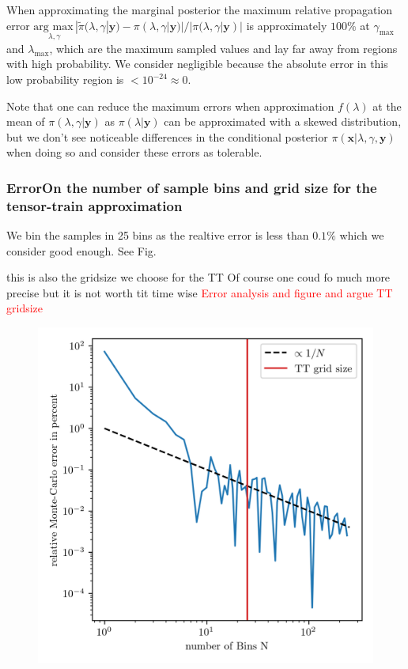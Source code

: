 When approximating the marginal posterior the maximum relative propagation error $\underset{\lambda , \gamma}{\text{arg max}\,}|\tilde{\pi}(\lambda,\gamma|\bm{y}) - \pi(\lambda,\gamma|\bm{y}) |/ |\pi(\lambda,\gamma|\bm{y})|$ is approximately $100\%$ at $\gamma_{\text{max}}$ and $\lambda_{\text{max}}$, which are the maximum sampled values and lay far away from regions with high probability.
We consider negligible because the absolute error in this low probability region is $< 10^{-24} \approx 0$.


Note that one can reduce the maximum errors when approximation $f(\lambda)$ at the mean of $\pi(\lambda,\gamma|\bm{y})$ as $\pi(\lambda | \bm{y})$ can be approximated with a skewed distribution, but we don't see noticeable differences in the conditional posterior $\pi(\bm{x}|\lambda,\gamma,\bm{y})$ when doing so and consider these errors as tolerable.

\subsubsection{ErrorOn the number of sample bins and grid size for the tensor-train approximation}
We bin the samples in 25 bins as the realtive error is less than $0.1\%$ which we consider good enough. See Fig.

this is also the gridsize we choose for the TT
Of course one coud fo much more precise but it is not worth tit time wise
\textcolor{red}{Error analysis and figure and argue TT gridsize}

\begin{figure}[ht!]
	\centering
	\includegraphics{MeanAssPT.png}
	\caption[Monte-Carlo Error]{}
	\label{fig:MCError}
\end{figure}